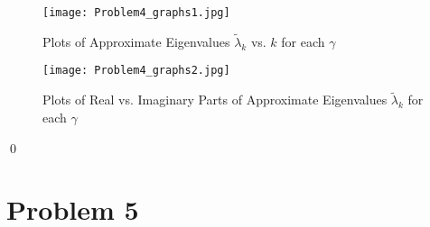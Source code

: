 \documentclass[12pt]{article}
\begin{document}
\begin{figure}[H]
\hspace{-.65in}
\texttt{[image: Problem4\_graphs1.jpg]}
\caption{Plots of Approximate Eigenvalues $\tilde{\lambda}_k$ vs. $k$ for each $\gamma$}
\end{figure}

\begin{figure}[H]
\hspace{-.65in}
\texttt{[image: Problem4\_graphs2.jpg]}
\caption{Plots of Real vs. Imaginary Parts of Approximate Eigenvalues $\tilde{\lambda}_k$ for each $\gamma$}
\end{figure}
\qed\\



\newpage
\section{Problem 5} 
\end{document}
